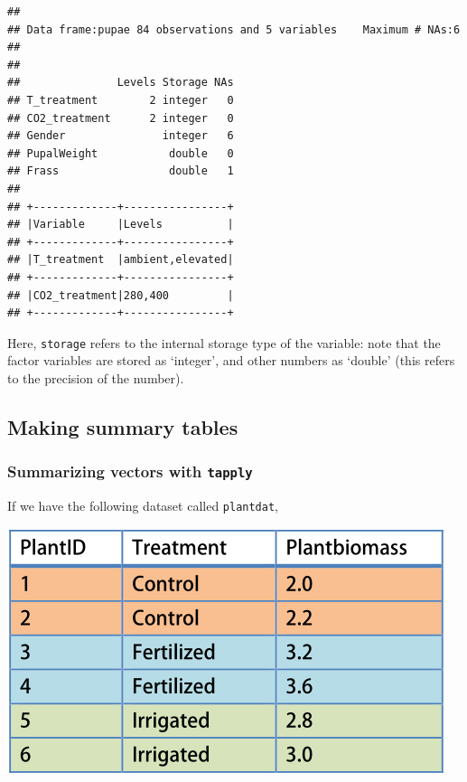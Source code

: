 \documentclass[]{book}
\newenvironment{Shaded}{\begin{snugshade}}{\end{snugshade}}
\newcommand{\CommentTok}[1]{\textcolor[rgb]{0.56,0.35,0.01}{\textit{#1}}}
\newcommand{\KeywordTok}[1]{\textcolor[rgb]{0.13,0.29,0.53}{\textbf{#1}}}
\newcommand{\NormalTok}[1]{#1}
\newcommand{\OperatorTok}[1]{\textcolor[rgb]{0.81,0.36,0.00}{\textbf{#1}}}
\newcommand{\StringTok}[1]{\textcolor[rgb]{0.31,0.60,0.02}{#1}}
\begin{document}
\begin{Shaded}
\end{Shaded}

\begin{verbatim}
## 
## Data frame:pupae 84 observations and 5 variables    Maximum # NAs:6
## 
## 
##               Levels Storage NAs
## T_treatment        2 integer   0
## CO2_treatment      2 integer   0
## Gender               integer   6
## PupalWeight           double   0
## Frass                 double   1
## 
## +-------------+----------------+
## |Variable     |Levels          |
## +-------------+----------------+
## |T_treatment  |ambient,elevated|
## +-------------+----------------+
## |CO2_treatment|280,400         |
## +-------------+----------------+
\end{verbatim}

Here, \texttt{storage} refers to the internal storage type of the variable: note that the factor variables are stored as `integer', and other numbers as `double' (this refers to the precision of the number).

\hypertarget{tapplyaggregate}{%
\subsection{Making summary tables}\label{tapplyaggregate}}

\hypertarget{tapply}{%
\subsubsection{\texorpdfstring{Summarizing vectors with \texttt{tapply}}{Summarizing vectors with tapply}}\label{tapply}}

If we have the following dataset called \texttt{plantdat},

\includegraphics[width=0.33\linewidth]{screenshots/exampledata}
\end{document}
